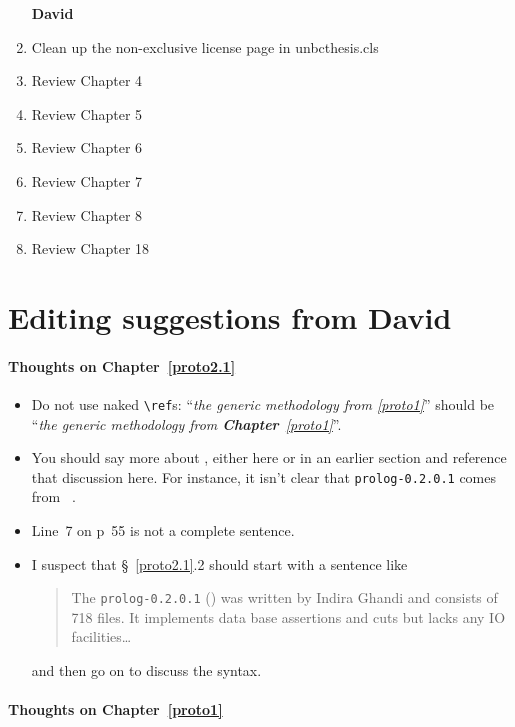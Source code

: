\begin{scope}
\begin{enumerate}
\item [\textbf{David}]
\item Clean up the non-exclusive license page in unbcthesis.cls
\item Review Chapter 4
\item Review Chapter 5
\item Review Chapter 6
\item Review Chapter 7
\item Review Chapter 8
\item Review Chapter 18

\end{enumerate}

\section{Editing suggestions from David}\label{sec:edit-sugg-david}

\paragraph{Thoughts on Chapter~\ref{proto2.1}}\mbox{}

\begin{itemize}
\item
  Do not use naked \Verb!\ref!s:
  ``\textit{the generic methodology from \ref{proto1}}''
  should be
  ``\textsl{the generic methodology from \textbf{\upshape
      Chapter}~\ref{proto1}}''.
\item
  You should say more about \cite{prolog-lib}, either here or in an
  earlier section and reference that discussion here.  For instance, it
  isn't clear that \Verb!prolog-0.2.0.1! comes from~ \cite{prolog-lib}.
\item
  Line~7 on p~55 is not a complete sentence.
\item
  I suspect that \S~\ref{proto2.1}.2 should start with a sentence like 
  \begin{quote}\color[rgb]{0.3,0,0.6}\small\singlespacing
    The \Verb!prolog-0.2.0.1! (\cite{prolog-lib}) was written by Indira
    Ghandi and consists of 718  files.
    It implements data base assertions and cuts but lacks any IO
    facilities\dots
  \end{quote}
  and then go on to discuss the syntax.
\end{itemize}

\paragraph{Thoughts on Chapter~\ref{proto1}}


\end{scope}

